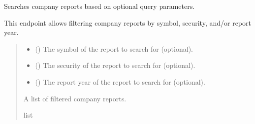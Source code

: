 \documentclass[letterpaper,10pt,english]{sphinxmanual}
\begin{document}

\begin{fulllineitems}
\label{\detokenize{my_fastapi:my_fastapi.main.search_reports}}
\pysigstartsignatures
\pysiglinewithargsret
{}
{\sphinxparamcomma {}\sphinxparamcomma {}}
{}
\pysigstopsignatures
\sphinxAtStartPar
Searches company reports based on optional query parameters.

\sphinxAtStartPar
This endpoint allows filtering company reports by symbol, security, and/or report year.
\begin{quote}\begin{description}
\begin{itemize}
\item {} 
\sphinxAtStartPar
{} (\sphinxstyleliteralemphasis{\sphinxupquote{{[}}}\sphinxstyleliteralemphasis{\sphinxupquote{{]}}}) \textendash{} The symbol of the report to search for (optional).

\item {} 
\sphinxAtStartPar
{} (\sphinxstyleliteralemphasis{\sphinxupquote{{[}}}\sphinxstyleliteralemphasis{\sphinxupquote{{]}}}) \textendash{} The security of the report to search for (optional).

\item {} 
\sphinxAtStartPar
{} (\sphinxstyleliteralemphasis{\sphinxupquote{{[}}}\sphinxstyleliteralemphasis{\sphinxupquote{{]}}}) \textendash{} The report year of the report to search for (optional).

\end{itemize}

\sphinxAtStartPar
A list of filtered company reports.

\sphinxAtStartPar
list

\end{description}\end{quote}

\end{fulllineitems}
\end{document}
